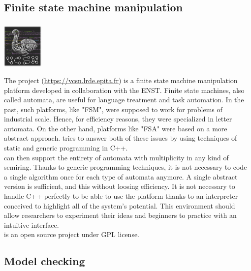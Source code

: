 \subsection{Finite state machine manipulation}
\subsubsection{\VCSN}
\begin{center}
 \includegraphics[width=2cm]{img/vcsn.png}
\end{center}
The \VCSN project (\url{https://vcsn.lrde.epita.fr}) is a finite state machine manipulation
platform developed in collaboration with the ENST. Finite state machines, also called automata,
are useful for language treatment and task automation. In the past, such platforms, like "FSM",
were supposed to work for problems of industrial scale. Hence, for efficiency reasons, they were
specialized in letter automata. On the other hand, platforms like "FSA" were based on a more abstract
approach. \VCSN tries to answer both of these issues by using techniques of static and generic
programming in C++.\\

\VCSN can then support the entirety of automata with multiplicity in any kind of
semiring. Thanks to generic programming techniques, it is not necessary to code a single algorithm once
for each type of automata anymore. A single abstract version is sufficient, and this without loosing
efficiency. It is not necessary to handle C++ perfectly to be able to use the platform thanks to an
interpreter conceived to highlight all of the system's potential. This environment should allow
researchers to experiment their ideas and beginners to practice with an intuitive interface.\\

\VCSN is an open source project under GPL license.


\subsection{Model checking}
